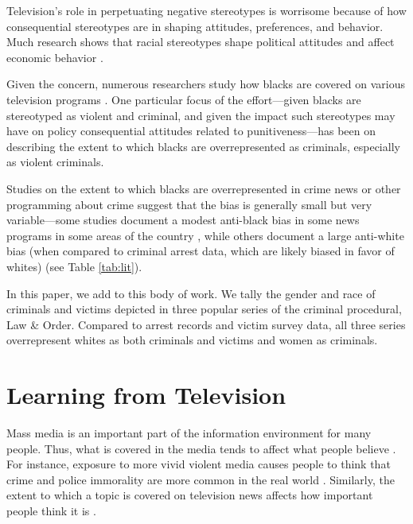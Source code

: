 \documentclass[11pt, letterpaper]{article}
\begin{document}
Television's role in perpetuating negative stereotypes is worrisome because of how consequential stereotypes are in shaping attitudes, preferences, and behavior. Much research shows that racial stereotypes shape political attitudes \citep[see, for e.g.,][]{sniderman1995scar, hurwitz1997public, peffley1997racial, dixon2006psychological} and affect economic behavior \citep[see, for e.g.,][]{bertrand2004emily}.

Given the concern, numerous researchers study how blacks are covered on various television programs \citep[for e.g.,][]{entman2001black, eschholz2004images}. One particular focus of the effort---given blacks are stereotyped as violent and criminal, and given the impact such stereotypes may have on policy consequential attitudes related to punitiveness---has been on describing the extent to which blacks are overrepresented as criminals, especially as violent criminals.

Studies on the extent to which blacks are overrepresented in crime news or other programming about crime suggest that the bias is generally small but very variable---some studies document a modest anti-black bias in some news programs in some areas of the country \citep{gilliam1996crime}, while others document a large anti-white bias (when compared to criminal arrest data, which are likely biased in favor of whites) \citep{chiricos2002racial, dixon2000overrepresentation, eschholz2004images} (see Table \ref{tab:lit}).



In this paper, we add to this body of work. We tally the gender and race of criminals and victims depicted in three popular series of the criminal procedural, Law \& Order. Compared to arrest records and victim survey data, all three series overrepresent whites as both criminals and victims and women as criminals.

\section*{Learning from Television}
Mass media is an important part of the information environment for many people. Thus, what is covered in the media tends to affect what people believe \citep{gerbner1986living, shanahan1999television}. For instance, exposure to more vivid violent media causes people to think that crime and police immorality are more common in the real world \citep{riddle2010always}. Similarly, the extent to which a topic is covered on television news affects how important people think it is \citep{mccombs1972agenda, iyengar2010news, iyengar1990accessibility}.
\end{document}
